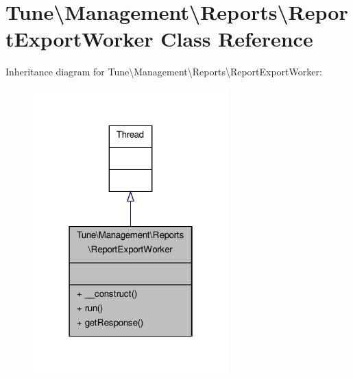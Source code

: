 \hypertarget{classTune_1_1Management_1_1Reports_1_1ReportExportWorker}{\section{Tune\textbackslash{}Management\textbackslash{}Reports\textbackslash{}Report\-Export\-Worker Class Reference}
\label{classTune_1_1Management_1_1Reports_1_1ReportExportWorker}
}


Inheritance diagram for Tune\textbackslash{}Management\textbackslash{}Reports\textbackslash{}Report\-Export\-Worker\-:
\nopagebreak
\begin{figure}[H]
\begin{center}
\leavevmode
\includegraphics[width=214pt]{classTune_1_1Management_1_1Reports_1_1ReportExportWorker__inherit__graph}
\end{center}
\end{figure}


